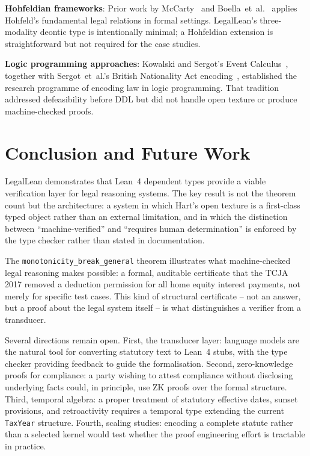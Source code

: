 \documentclass[runningheads]{llncs}
\begin{document}
\textbf{Hohfeldian frameworks}: Prior work by
McCarty~\cite{mccarty1977reflections} and
Boella~et~al.~\cite{boella2006introduction} applies Hohfeld's fundamental legal
relations in formal settings. LegalLean's three-modality deontic type is
intentionally minimal; a Hohfeldian extension is straightforward but not required
for the case studies.

\textbf{Logic programming approaches}: Kowalski and Sergot's Event
Calculus~\cite{shanahan1999event}, together with Sergot~et~al.'s British
Nationality Act encoding~\cite{sergot1986british}, established the research
programme of encoding law in logic programming. That tradition addressed
defeasibility before DDL but did not handle open texture or produce
machine-checked proofs.

\section{Conclusion and Future Work}

LegalLean demonstrates that Lean~4 dependent types provide a viable verification
layer for legal reasoning systems. The key result is not the theorem count but
the architecture: a system in which Hart's open texture is a first-class typed
object rather than an external limitation, and in which the distinction between
``machine-verified'' and ``requires human determination'' is enforced by the type
checker rather than stated in documentation.

The \texttt{monotonicity\_break\_general} theorem illustrates what
machine-checked legal reasoning makes possible: a formal, auditable certificate
that the TCJA 2017 removed a deduction permission for all home equity interest
payments, not merely for specific test cases. This kind of structural certificate
-- not an answer, but a proof about the legal system itself -- is what
distinguishes a verifier from a transducer.

Several directions remain open. First, the transducer layer: language models are
the natural tool for converting statutory text to Lean~4 stubs, with the type
checker providing feedback to guide the formalisation. Second, zero-knowledge
proofs for compliance: a party wishing to attest compliance without disclosing
underlying facts could, in principle, use ZK proofs over the formal structure.
Third, temporal algebra: a proper treatment of statutory effective dates, sunset
provisions, and retroactivity requires a temporal type extending the current
\texttt{TaxYear} structure. Fourth, scaling studies: encoding a complete statute
rather than a selected kernel would test whether the proof engineering effort is
tractable in practice.
\end{document}
